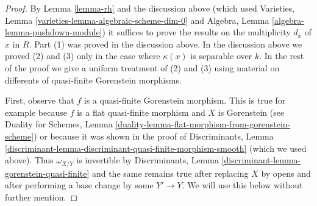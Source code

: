 \begin{proof}
By Lemma \ref{lemma-rh} and the discussion above
(which used
Varieties, Lemma \ref{varieties-lemma-algebraic-scheme-dim-0}
and
Algebra, Lemma \ref{algebra-lemma-pushdown-module})
it suffices to prove the results on the
multiplicity $d_x$ of $x$ in $R$. Part (1) was proved
in the discussion above. In the discussion above
we proved (2) and (3) only in the case where $\kappa(x)$ is
separable over $k$.
In the rest of the proof we give a uniform treatment
of (2) and (3) using material on differents of
quasi-finite Gorenstein morphisms.

\medskip\noindent
First, observe that $f$ is a quasi-finite Gorenstein morphism.
This is true for example because
$f$ is a flat quasi-finite morphism and $X$ is Gorenstein
(see Duality for Schemes, Lemma
\ref{duality-lemma-flat-morphism-from-gorenstein-scheme})
or because it was shown in the proof of
Discriminants, Lemma
\ref{discriminant-lemma-discriminant-quasi-finite-morphism-smooth}
(which we used above). Thus $\omega_{X/Y}$ is invertible by
Discriminants, Lemma \ref{discriminant-lemma-gorenstein-quasi-finite}
and the same remains true after replacing $X$ by opens and after
performing a base change by some $Y' \to Y$. We will use this
below without further mention.


\end{proof}
